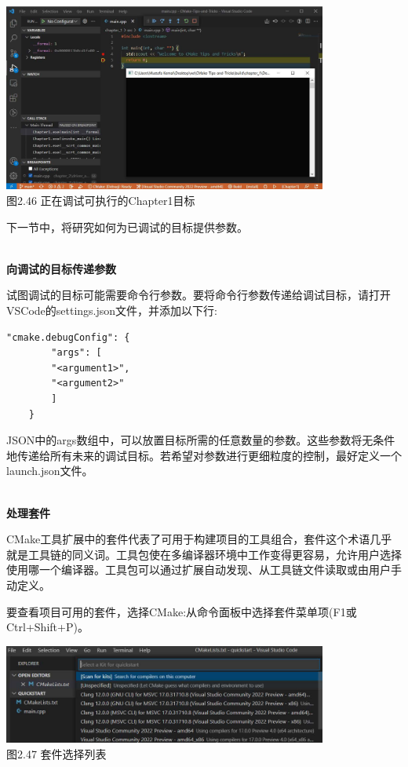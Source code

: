 \begin{center}
\includegraphics[width=0.8\textwidth]{content/1/chapter2/images/46.jpg}\\
图2.46 正在调试可执行的Chapter1目标
\end{center}

下一节中，将研究如何为已调试的目标提供参数。

\hspace*{\fill} \\ %
\noindent
\textbf{向调试的目标传递参数}

试图调试的目标可能需要命令行参数。要将命令行参数传递给调试目标，请打开VSCode的settings.json文件，并添加以下行:

\begin{lstlisting}[style=styleCMake]
"cmake.debugConfig": {
		"args": [
		"<argument1>",
		"<argument2>"
		]
	}
\end{lstlisting}

JSON中的args数组中，可以放置目标所需的任意数量的参数。这些参数将无条件地传递给所有未来的调试目标。若希望对参数进行更细粒度的控制，最好定义一个launch.json文件。

\hspace*{\fill} \\ %
\noindent
\textbf{处理套件}

CMake工具扩展中的套件代表了可用于构建项目的工具组合，套件这个术语几乎就是工具链的同义词。工具包使在多编译器环境中工作变得更容易，允许用户选择使用哪一个编译器。工具包可以通过扩展自动发现、从工具链文件读取或由用户手动定义。

要查看项目可用的套件，选择CMake:从命令面板中选择套件菜单项(F1或Ctrl+Shift+P)。

\begin{center}
\includegraphics[width=0.8\textwidth]{content/1/chapter2/images/47.jpg}\\
图2.47 套件选择列表
\end{center}

